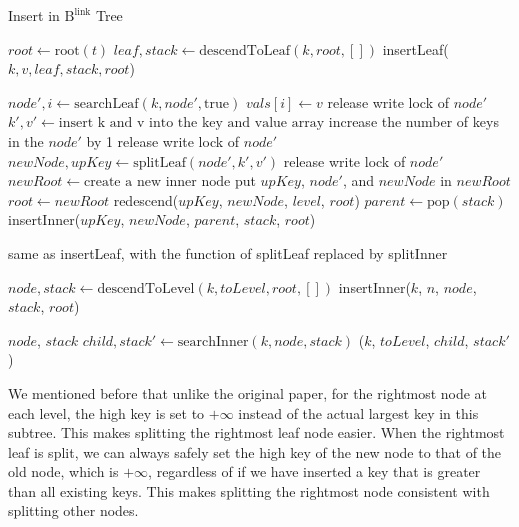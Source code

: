 \documentclass[11pt]{report}
\theoremstyle{definition}
\begin{document}
\begin{algorithm}[h]
  \caption{Insert in $\text{B}^{\text{link}}$ Tree}\label{alg:blink-insert}
  \begin{algorithmic}[1] %
    \State $root \gets \text{root}(t)$
    \State $leaf, stack \gets \text{descendToLeaf}(k, root, [])$
    \State insertLeaf($k, v, leaf, stack, root$)
    \EndFunction

    \State $node', i \gets \text{searchLeaf}(k, node', \text{true})$
    \State $vals[i] \gets v$
    \State release write lock of $node'$
    \Else
    \State $k', v' \gets \text{insert k and v into the key and value array}$
    \State increase the number of keys in the $node'$ by 1
    \State release write lock of $node'$
    \Else
    \State $newNode, upKey \gets \text{splitLeaf}(node', k', v')$
    \State release write lock of $node'$
    \State $newRoot \gets \text{create a new inner node}$
    \State put $upKey$, $node'$, and $newNode$ in $newRoot$
    \State $root \gets newRoot$
    \Else
    \State redescend($upKey$, $newNode$, $level$, $root$)
    \EndIf
    \Else
    \State $parent \gets \text{pop}(stack)$
    \State insertInner($upKey$, $newNode$, $parent$, $stack$, $root$)
    \EndIf
    \EndIf
    \EndIf
    \EndFunction

    \State same as insertLeaf, with the function of splitLeaf replaced by splitInner
    \EndFunction

    \State $node, stack \gets \text{descendToLevel}(k, toLevel, root, [])$
    \State insertInner($k$, $n$, $node$, $stack$, $root$)
    \EndFunction

    \State \Return $node$, $stack$
    \Else
    \State $child, stack' \gets \text{searchInner}(k, node, stack)$
    \State \Return {}($k$, $toLevel$, $child$, $stack'$)
    \EndIf
    \EndFunction
  \end{algorithmic}
\end{algorithm}

We mentioned before that unlike the original paper, for the rightmost node at each level, the high key is set to $+\infty$ instead of the actual largest key in this subtree. This makes splitting the rightmost leaf node easier. When the rightmost leaf is split, we can always safely set the high key of the new node to that of the old node, which is $+\infty$, regardless of if we have inserted a key that is greater than all existing keys. This makes splitting the rightmost node consistent with splitting other nodes.
\end{document}
